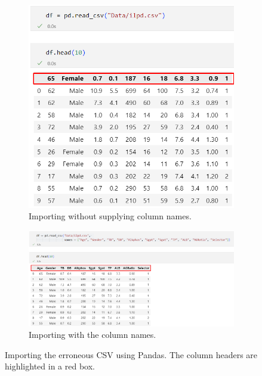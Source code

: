 \documentclass[12pt]{report}
\begin{document}
\begin{figure}[H]
    \centering
    \begin{subfigure}{0.75\textwidth}
       \includegraphics[width=1\linewidth]{pandasNoNames.png}
       \caption{Importing without supplying column names.}
       \label{fig:pandasNames} 
    \end{subfigure}
    
    \begin{subfigure}{1\textwidth}
       \includegraphics[width=1\linewidth]{pandasNames.png}
       \caption{Importing with the column names.}
       \label{fig:PN2}
    \end{subfigure}
    \caption{Importing the erroneous CSV using Pandas. The column headers are highlighted in a red box.}
\end{figure}
\end{document}

